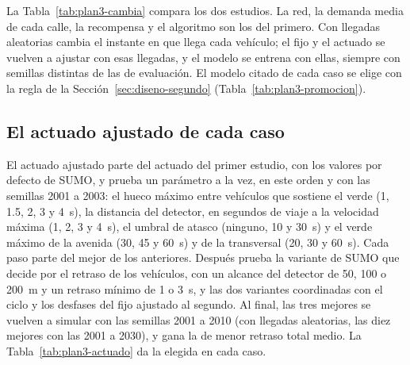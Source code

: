 La Tabla~\ref{tab:plan3-cambia} compara los dos estudios. La red, la
demanda media de cada calle, la recompensa y el algoritmo son los del
primero. Con llegadas aleatorias cambia el instante en que llega cada
vehículo; el fijo y el actuado se vuelven a ajustar con esas llegadas,
y el modelo se entrena con ellas, siempre con semillas distintas de las
de evaluación. El modelo citado de cada caso se elige con la regla de
la Sección~\ref{sec:diseno-segundo} (Tabla~\ref{tab:plan3-promocion}).

\subsection*{El actuado ajustado de cada caso}

El actuado ajustado parte del actuado del primer estudio, con los
valores por defecto de SUMO, y prueba un parámetro a la vez, en este
orden y con las semillas 2001 a 2003: el hueco máximo entre vehículos
que sostiene el verde (1, 1.5, 2, 3 y 4~s), la distancia del detector,
en segundos de viaje a la velocidad máxima (1, 2, 3 y 4~s), el umbral
de atasco (ninguno, 10 y 30~s) y el verde máximo de la avenida (30, 45
y 60~s) y de la transversal (20, 30 y 60~s). Cada paso parte del mejor
de los anteriores. Después prueba la variante de SUMO que decide por el
retraso de los vehículos, con un alcance del detector de 50, 100 o
200~m y un retraso mínimo de 1 o 3~s, y las dos variantes coordinadas
con el ciclo y los desfases del fijo ajustado al segundo. Al final, las
tres mejores se vuelven a simular con las semillas 2001 a 2010 (con
llegadas aleatorias, las diez mejores con las 2001 a 2030), y gana la
de menor retraso total medio. La Tabla~\ref{tab:plan3-actuado} da la
elegida en cada caso.

